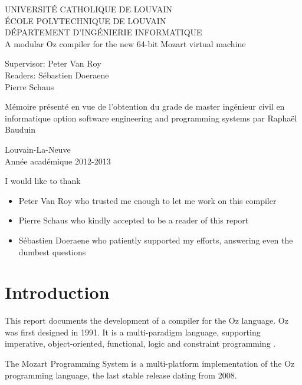 \documentclass[a4paper]{memoir}
\newcommand*{\titleMS}{\begingroup%
{

\pagestyle{empty}
\centering 
{\LARGE UNIVERSITÉ CATHOLIQUE DE LOUVAIN}\\
{\LARGE ÉCOLE POLYTECHNIQUE DE LOUVAIN}\\
{\LARGE DÉPARTEMENT D'INGÉNIERIE INFORMATIQUE}\\[2\baselineskip]
\vspace{0.2\textheight}
{\LARGE A modular Oz compiler for the new 64-bit Mozart virtual machine}\par
\vspace{0.2\textheight}
\begin{minipage}[t]{0.45\textwidth}
  Supervisor: Peter Van Roy\\
  Readers: \hspace{3.9mm}S\'{e}bastien Doeraene\\
  \hspace*{18.5mm}Pierre Schaus
\end{minipage}
\hspace{3mm}
\begin{minipage}[t]{0.55\textwidth}
  M\'{e}moire pr\'{e}sent\'{e} en vue de l'obtention du grade de master ing\'{e}nieur civil en informatique option software engineering and programming systems par Raphaël Bauduin
\end{minipage}
\vspace*{2cm}
\begin{minipage}[t]{\textwidth}
\vspace*{4cm}
\centering 

Louvain-La-Neuve\\
Ann\'{e}e acad\'{e}mique 2012-2013
\end{minipage}
} %
\endgroup}
\begin{document}
\newcommand{\nav}[1]{}
\renewcommand{\topfraction}{.85}
\renewcommand{\bottomfraction}{.7}
\renewcommand{\textfraction}{.15}
\renewcommand{\floatpagefraction}{.66}
\renewcommand{\dbltopfraction}{.66}
\renewcommand{\dblfloatpagefraction}{.66}
\setcounter{topnumber}{9}
\setcounter{bottomnumber}{9}
\setcounter{totalnumber}{20}
\setcounter{dbltopnumber}{9}

\lstset{language=Oz,basicstyle=\ttfamily\small,columns=fullflexible,keepspaces=true,
escapechar=µ}

\ifdraftdoc
{}
\fi

%
\frontmatter

\begin{titlingpage}
\titleMS
\end{titlingpage}

I would like to thank
\begin{itemize}
  \item Peter Van Roy who trusted me enough to let me work on this compiler
  \item Pierre Schaus who kindly accepted to be a reader of this report
  \item S\'{e}bastien Doeraene who patiently supported my efforts, answering even the dumbest questions 
\end{itemize}
\cleardoublepage

\tableofcontents

\mainmatter
\chapter{Introduction}

This report documents the development of a compiler for the Oz language. Oz was first designed in 1991. It is a multi-paradigm language, supporting imperative, object-oriented, functional, logic and constraint programming \cite{OzOv}.

The Mozart Programming System is a multi-platform implementation of the Oz programming language\cite{Moz}, the last stable release dating from 2008.
\end{document}
